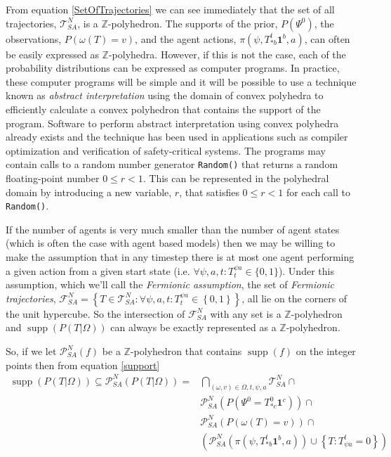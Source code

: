 \documentclass{article}
\DeclareMathOperator\supp{supp}
\begin{document}
From equation \ref{SetOfTrajectories} we can see immediately that the set of all trajectories, $\mathcal{T}^N_{SA}$, is a  $\mathbb{Z}$-polyhedron. The supports of the prior, $P(\Psi^0)$, the observations, $P(\omega(T)=v)$, and the agent actions, $\pi(\psi,T^t_{*b}\mathbf{1}^b,a)$, can often be easily expressed as $\mathbb{Z}$-polyhedra. However, if this is not the case, each of the probability distributions can be expressed as computer programs. In practice, these computer programs will be simple and it will be possible to use a technique known as \textit{abstract interpretation}\cite{cousot1977abstract} using the domain of convex polyhedra\cite{cousot1978automatic}\cite{becchi2018efficient}\cite{fukuda2020polyhedral} to efficiently calculate a convex polyhedron that contains the support of the program. Software to perform abstract interpretation using convex polyhedra already exists\cite{henry2012pagai}\cite{GN2021}\cite{jeannet2009apron}\cite{bagnara2008parma} and the technique has been used in applications such as compiler optimization\cite{nsjodin2009design} and verification of safety-critical systems\cite{halbwachs1997verification}. The programs may contain calls to a random number generator \texttt{Random()} that returns a random floating-point number $0 \le r < 1$. This can be represented in the polyhedral domain by introducing a new variable, $r$, that satisfies $0 \le r < 1$ for each call to \texttt{Random()}.

If the number of agents is very much smaller than the number of agent states (which is often the case with agent based models) then we may be willing to make the assumption that in any timestep there is at most one agent performing a given action from a given start state (i.e. $\forall \psi, a, t: T^{\psi a}_t \in \{0,1\}$). Under this assumption, which we'll call the \textit{Fermionic assumption}, the set of \textit{Fermionic trajectories}, $\mathcal{F}^N_{SA} = \left\{T\in\mathcal{T}^N_{SA}: \forall \psi, a, t: T^{\psi a}_t \in \left\{0,1\right\}\right\}$, all lie on the corners of the unit hypercube. So the intersection of $\mathcal{F}^N_{SA}$ with any set is a $\mathbb{Z}$-polyhedron and $\supp(P(T|\Omega))$ can always be exactly represented as a $\mathbb{Z}$-polyhedron.

So, if we let $\mathcal{P}^N_{SA}(f)$ be a $\mathbb{Z}$-polyhedron that contains $\supp(f)$ on the integer points then from equation \eqref{support}
\begin{equation}
\begin{aligned}
\supp(P( T |\Omega)) \subseteq \mathcal{P}^N_{SA}(P(T|\Omega)) =
& \bigcap_{(\omega,v) \in \Omega,t,\psi, a} \mathcal{T}^N_{SA} \cap \\
& \mathcal{P}^N_{SA}(P(\Psi^0 = T^0_{* c}\mathbf{1}^c)) \cap\\
&    \mathcal{P}^N_{SA}\left(P\left(\omega(T)=v\right)\right) \cap \\
& 
\left(\mathcal{P}^N_{SA}\left(\pi(\psi,T^t_{* b}\mathbf{1}^b,a)\right)
\cup
\left\{T: T^t_{\psi a} = 0\right\}\right)
\\
\end{aligned}
\label{polyhedralSupport}
\end{equation}
\end{document}
